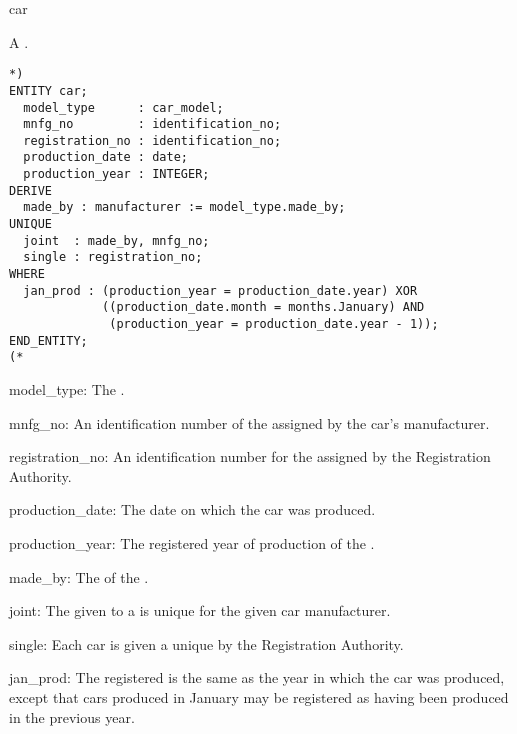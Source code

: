 \documentclass{article}
\begin{document}
\begin{Mnamedesc}{car}
\begin{Mdesctext}
   A .
\end{Mdesctext}

\begin{Mexp}
\begin{verbatim}
*)
ENTITY car;
  model_type      : car_model;
  mnfg_no         : identification_no;
  registration_no : identification_no;
  production_date : date;
  production_year : INTEGER;
DERIVE
  made_by : manufacturer := model_type.made_by;
UNIQUE
  joint  : made_by, mnfg_no;
  single : registration_no;
WHERE
  jan_prod : (production_year = production_date.year) XOR
             ((production_date.month = months.January) AND
              (production_year = production_date.year - 1));
END_ENTITY;
(*
\end{verbatim}
\end{Mexp}

\begin{Matts}

\item[model\_type:] The .

\item[mnfg\_no:] An identification number of the  assigned by the
car's manufacturer.

\item[registration\_no:] An identification number for the  assigned
by the Registration Authority.

\item[production\_date:] The date on which the car was produced.

\item[production\_year:] The registered year of production of the .

\item[made\_by:] The  of the .
\end{Matts}

\begin{Mprops}

\item[joint:] The  given to a  is unique for the given
car manufacturer.

\item[single:] Each car is given a unique  by the
Registration Authority.

\item[jan\_prod:] The registered  is the same as the year
in which the car was produced, except that cars produced in January may be
registered as having been produced in the previous year.
\end{Mprops}
\end{Mnamedesc}
\end{document}
